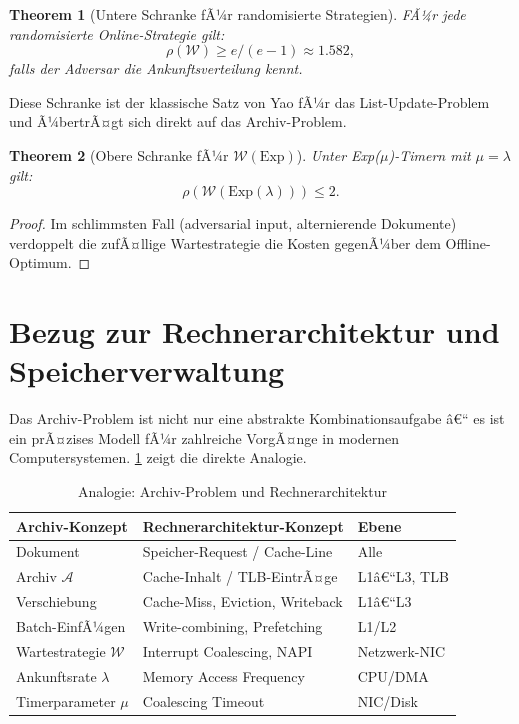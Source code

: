 ﻿\documentclass[12pt, a4paper]{article}
\newtheorem{theorem}{Theorem}[section]
\newcommand{\Exp}{\mathrm{Exp}}
\begin{document}
\begin{theorem}[Untere Schranke fÃ¼r randomisierte Strategien]\label{thm:lower}
FÃ¼r jede randomisierte Online-Strategie gilt:
\[
  \rho(\mathcal{W}) \geq e/(e-1) \approx 1.582,
\]
falls der Adversar die Ankunftsverteilung kennt.
\end{theorem}

Diese Schranke ist der klassische Satz von Yao fÃ¼r das List-Update-Problem
und Ã¼bertrÃ¤gt sich direkt auf das Archiv-Problem.

\begin{theorem}[Obere Schranke fÃ¼r $\mathcal{W}(\Exp)$]\label{thm:upper}
Unter Exp($\mu$)-Timern mit $\mu = \lambda$ gilt:
\[
  \rho(\mathcal{W}(\Exp(\lambda))) \leq 2.
\]
\end{theorem}

\begin{proof}
Im schlimmsten Fall (adversarial input, alternierende Dokumente) verdoppelt
die zufÃ¤llige Wartestrategie die Kosten gegenÃ¼ber dem Offline-Optimum.
\end{proof}

\section{Bezug zur Rechnerarchitektur und Speicherverwaltung}\label{sec:architecture}

Das Archiv-Problem ist nicht nur eine abstrakte Kombinationsaufgabe â€“ es
ist ein prÃ¤zises Modell fÃ¼r zahlreiche VorgÃ¤nge in modernen Computersystemen.
\cref{tab:mapping} zeigt die direkte Analogie.

\begin{table}[ht]
\centering
\caption{Analogie: Archiv-Problem und Rechnerarchitektur}
\label{tab:mapping}
\renewcommand{\arraystretch}{1.4}
\begin{tabular}{lll}
\toprule
\textbf{Archiv-Konzept} & \textbf{Rechnerarchitektur-Konzept} & \textbf{Ebene}\\
\midrule
Dokument               & Speicher-Request / Cache-Line      & Alle\\
Archiv $\mathcal{A}$   & Cache-Inhalt / TLB-EintrÃ¤ge        & L1â€“L3, TLB\\
Verschiebung           & Cache-Miss, Eviction, Writeback    & L1â€“L3\\
Batch-EinfÃ¼gen         & Write-combining, Prefetching       & L1/L2\\
Wartestrategie $\mathcal{W}$ & Interrupt Coalescing, NAPI      & Netzwerk-NIC\\
Ankunftsrate $\lambda$ & Memory Access Frequency            & CPU/DMA\\
Timerparameter $\mu$   & Coalescing Timeout                 & NIC/Disk\\
\bottomrule
\end{tabular}
\end{table}
\end{document}
